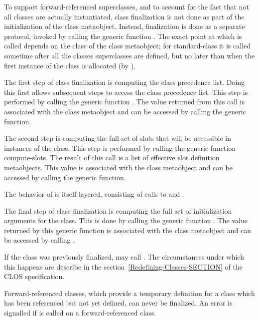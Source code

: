 To support forward-referenced superclasses, and to account for the fact that not
all classes are actually instantiated, class finalization is not done as part of
the initialization of the class metaobject. Instead, finalization is done as a
separate protocol, invoked by calling the generic function
. The exact point at which 
is called depends on the class of the class metaobject; for standard-class it is
called sometime after all the classes superclasses are defined, but no later
than when the first instance of the class is allocated (by
).

The first step of class finalization is computing the class precedence
list. Doing this first allows subsequent steps to access the class precedence
list. This step is performed by calling the generic function
. The value returned from this call is associated
with the class metaobject and can be accessed by calling the
 generic function. 

The second step is computing the full set of slots that will be accessible in
instances of the class. This step is performed by calling the generic function
compute-slots. The result of this call is a list of effective slot definition
metaobjects. This value is associated with the class metaobject and can be
accessed by calling the  generic function. 

The behavior of  is itself layered, consisting of calls to
 and . 

The final step of class finalization is computing the full set of initialization
arguments for the class. This is done by calling the generic function
. The value returned by this generic function is
associated with the class metaobject and can be accessed by calling
. 

If the class was previously finalized,  may call
. The circumstances under which this happens are describe
in the section~\ref{Redefining-Classes-SECTION} of the CLOS specification.

Forward-referenced classes, which provide a temporary definition for a class
which has been referenced but not yet defined, can never be finalized. An error
is signalled if  is called on a forward-referenced class. 


